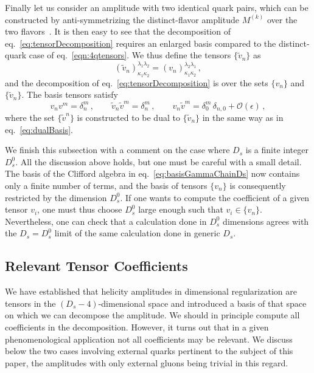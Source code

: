 Finally let us consider an amplitude with two identical quark
pairs, which can be constructed by anti-symmetrizing the
distinct-flavor amplitude $M^{(k)}$ over the two
flavors~\cite{DeFreitas:2004kmi,Glover:2004si}.
It is then easy to see that the decomposition of
eq.~\eqref{eq:tensorDecomposition} requires an enlarged basis
compared to the distinct-quark case of
eq.~\eqref{eqn:4qtensors}. We thus define the tensors
$\{\tilde v_n\}$ as
\begin{equation}\label{eq:basisIdentical}
	(\tilde v_n)_{\kappa_1\kappa_2}^{\lambda_1\lambda_2}=
	(v_n)_{\kappa_1\kappa_2}^{\lambda_2\lambda_1}\,,
\end{equation}
and the decomposition of eq.~\eqref{eq:tensorDecomposition}
is over the sets $\{v_n\}$ and $\{\tilde v_n\}$.
The basis tensors satisfy
\begin{equation}\label{eq:dualBasisIdentical}
	v_nv^m=\delta^m_n\,,\qquad
	\tilde v_n\tilde v^m=\delta^m_n\,,\qquad
	v_n\tilde v^m=
	\delta^m_0\,\delta_{n,0}+\mathcal{O}(\epsilon)\,,
\end{equation}
where the set $\{\tilde v^n\}$ is constructed to be dual to
$\{\tilde v_n\}$ in the same way as in 
eq.~\eqref{eq:dualBasis}.

We finish this subsection with a comment on the case where $D_s$
is a finite integer $D_s^0$. 
All the discussion above holds, but one
must be careful with a small detail. 
The basis of the Clifford algebra in 
eq.~\eqref{eq:basisGammaChainDs} now contains only a finite 
number of terms, and the basis of tensors $\{v_n\}$ is
consequently restricted by the dimension $D^0_s$. 
If one wants to compute the coefficient of a given tensor 
$v_i$, one must thus choose $D_s^0$ large enough such
that $v_i \in \{v_n\}$. Nevertheless, one can check that a 
calculation done in $D_s^0$ dimensions agrees 
with the $D_s=D_s^0$ limit of the same calculation done in
generic $D_s$.


\subsection{Relevant Tensor Coefficients}
\label{sec:relevant_tensors}

We have established that helicity amplitudes in dimensional
regularization are tensors in the $(D_s-4)$-dimensional space and
introduced a basis of that space on which we can decompose the
amplitude.  We should in
principle compute all coefficients in the decomposition. However, it
turns out that in a given phenomenological application not all
coefficients may be relevant. We discuss below the two cases
involving external quarks pertinent to the subject of this 
paper, the amplitudes with only external gluons being trivial in
this regard.

